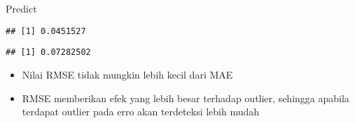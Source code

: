 \documentclass[
  ignorenonframetext,
]{beamer}
\newenvironment{Shaded}{\begin{snugshade}}{\end{snugshade}}
\newcommand{\AttributeTok}[1]{\textcolor[rgb]{0.77,0.63,0.00}{#1}}
\newcommand{\CommentTok}[1]{\textcolor[rgb]{0.56,0.35,0.01}{\textit{#1}}}
\newcommand{\FunctionTok}[1]{\textcolor[rgb]{0.00,0.00,0.00}{#1}}
\newcommand{\NormalTok}[1]{#1}
\newcommand{\SpecialCharTok}[1]{\textcolor[rgb]{0.00,0.00,0.00}{#1}}
\providecommand{\tightlist}{%
  \setlength{\itemsep}{0pt}\setlength{\parskip}{0pt}}
\begin{document}
\begin{frame}[fragile]{Predict}
\begin{Shaded}
\end{Shaded}

\begin{verbatim}
## [1] 0.0451527
\end{verbatim}

\begin{Shaded}
\end{Shaded}

\begin{verbatim}
## [1] 0.07282502
\end{verbatim}

\begin{itemize}
\tightlist
\item
  Nilai RMSE tidak mungkin lebih kecil dari MAE
\item
  RMSE memberikan efek yang lebih besar terhadap outlier, sehingga
  apabila terdapat outlier pada erro akan terdeteksi lebih mudah
\end{itemize}
\end{frame}
\end{document}
